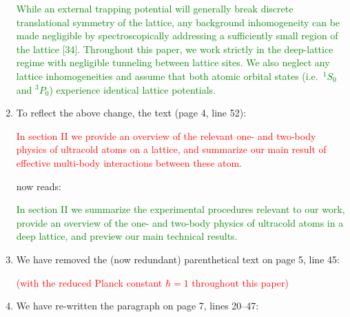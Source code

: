 \documentclass[preprint]{revtex4-1}
\newcommand{\1}{\mathds{1}}
\newcommand{\red}[1]{\textcolor{red}{#1}}
\newcommand{\green}[1]{\textcolor{green}{#1}}
\newcounter{point}
\newcommand{\step}{\stepcounter{point}\setcounter{enumi}{0}}
\begin{document}
\begin{enumerate}[label=(R1.\arabic{point}.\arabic*)]
  \green{While an external trapping potential will generally break
    discrete translational symmetry of the lattice, any background
    inhomogeneity can be made negligible by spectroscopically
    addressing a sufficiently small region of the lattice [34].
    Throughout this paper, we work strictly in the deep-lattice regime
    with negligible tunneling between lattice sites.  We also neglect
    any lattice inhomogeneities and assume that both atomic orbital
    states (i.e.~${}^1S_0$ and ${}^3P_0$) experience identical lattice
    potentials.}


\item To reflect the above change, the text (page 4, line 52):

  \red{In section II we provide an overview of the relevant one- and
    two-body physics of ultracold atoms on a lattice, and summarize
    our main result of effective multi-body interactions between these
    atom.}

  now reads:

  \green{In section II we summarize the experimental procedures
    relevant to our work, provide an overview of the one- and two-body
    physics of ultracold atoms in a deep lattice, and preview our main
    technical results.}


\item We have removed the (now redundant) parenthetical text on page
  5, line 45:

  \red{(with the reduced Planck constant $\hbar=1$ throughout this
    paper)}


  \step
\item We have re-written the paragraph on page 7, lines 20--47:


\end{enumerate}
\end{document}
